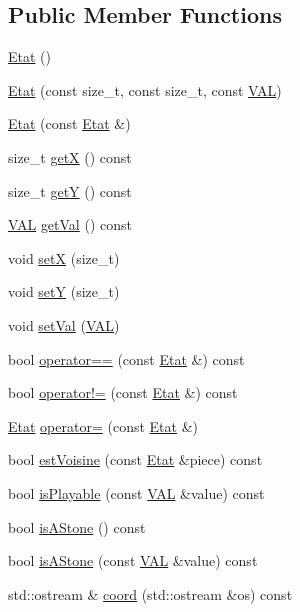 \subsection*{Public Member Functions}
\begin{DoxyCompactItemize}
\item 
\hyperlink{class_etat_a44b4313a1a0bc0584a36be447802f2f4}{Etat} ()
\item 
\hyperlink{class_etat_a1e1232441c425f3f9adbf8cc99d9407e}{Etat} (const size\+\_\+t, const size\+\_\+t, const \hyperlink{class_etat_af3ddb2296ffc379b7f3ad2bf832f294e}{V\+AL})
\item 
\hyperlink{class_etat_a4e8da39ecb5b8edf66cc02addef85024}{Etat} (const \hyperlink{class_etat}{Etat} \&)
\item 
size\+\_\+t \hyperlink{class_etat_aa25e66b110bc835523819392435e78c6}{getX} () const
\item 
size\+\_\+t \hyperlink{class_etat_a3e3e915f2261c83989a983e84b1273c1}{getY} () const
\item 
\hyperlink{class_etat_af3ddb2296ffc379b7f3ad2bf832f294e}{V\+AL} \hyperlink{class_etat_ac0b81bbcf64cb3cc574e5a9dcdf94382}{get\+Val} () const
\item 
void \hyperlink{class_etat_ac020c4fe222274ac849a03fc8f19a99a}{setX} (size\+\_\+t)
\item 
void \hyperlink{class_etat_a8a54fc9ecb1b97d84d2f1f259e3bf70e}{setY} (size\+\_\+t)
\item 
void \hyperlink{class_etat_aa88987ca54aee676717f05e4570c0aec}{set\+Val} (\hyperlink{class_etat_af3ddb2296ffc379b7f3ad2bf832f294e}{V\+AL})
\item 
bool \hyperlink{class_etat_afa4f3f731268802b2a9c693cb738707b}{operator==} (const \hyperlink{class_etat}{Etat} \&) const
\item 
bool \hyperlink{class_etat_a676159ce9be48a79d647f93cd9faee6e}{operator!=} (const \hyperlink{class_etat}{Etat} \&) const
\item 
\hyperlink{class_etat}{Etat} \hyperlink{class_etat_ad400bb5d992ce25d27d56832fa0a9872}{operator=} (const \hyperlink{class_etat}{Etat} \&)
\item 
bool \hyperlink{class_etat_ab6e6b44dd68c041150332cee66dc74a3}{est\+Voisine} (const \hyperlink{class_etat}{Etat} \&piece) const
\item 
bool \hyperlink{class_etat_ac2fae5806a96974ce7717bc61a0ec0e9}{is\+Playable} (const \hyperlink{class_etat_af3ddb2296ffc379b7f3ad2bf832f294e}{V\+AL} \&value) const
\item 
bool \hyperlink{class_etat_a98cc204acc13280c277e2aa6a32a54ec}{is\+A\+Stone} () const
\item 
bool \hyperlink{class_etat_a64d8c0196e3e4de340726e2be29dec97}{is\+A\+Stone} (const \hyperlink{class_etat_af3ddb2296ffc379b7f3ad2bf832f294e}{V\+AL} \&value) const
\item 
std\+::ostream \& \hyperlink{class_etat_a9aa2a1b7274bc6d8a66fbec9655e47d0}{coord} (std\+::ostream \&os) const
\end{DoxyCompactItemize}


